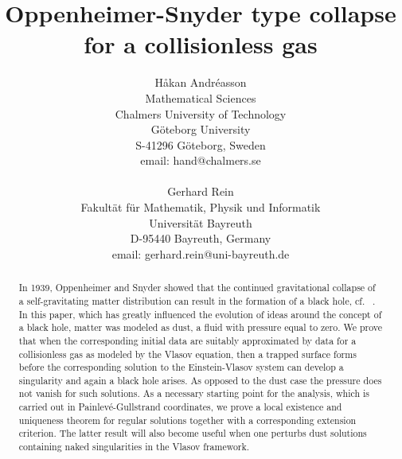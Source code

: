 \documentclass[11pt]{article}
\renewcommand{\theequation}{\arabic{section}.\arabic{equation}}
\begin{document}
\sloppy

\newtheorem{theorem}{Theorem}[section]
\newtheorem{definition}[theorem]{Definition}
\newtheorem{proposition}[theorem]{Proposition}
\newtheorem{cor}[theorem]{Corollary}
\newtheorem{lemma}[theorem]{Lemma}
\newtheorem*{comment}{Comment}
\theoremstyle{remark}
\newtheorem{remark}[theorem]{Remark}

\renewcommand{\theequation}{\arabic{section}.\arabic{equation}}

\title{Oppenheimer-Snyder type collapse for a collisionless gas}

\author{H{\aa}kan Andr\'{e}asson\\
        Mathematical Sciences\\
        Chalmers University of Technology\\
        G\"{o}teborg University\\
        S-41296 G\"oteborg, Sweden\\
        email: hand@chalmers.se\\
        \ \\
        Gerhard Rein\\
        Fakult\"at f\"ur Mathematik, Physik und Informatik\\
        Universit\"at Bayreuth\\
        D-95440 Bayreuth, Germany\\
        email: gerhard.rein@uni-bayreuth.de}

\maketitle

\begin{abstract}
  In 1939, {\sc Oppenheimer} and {\sc Snyder} showed that
  the continued gravitational collapse of a self-gravitating matter
  distribution can result in the formation of a black hole, cf.~ \cite{OS}.
  In this paper, which has greatly influenced the evolution of ideas
  around the concept of a black hole, matter was modeled as dust, a fluid
  with pressure equal to zero. We prove that when the corresponding initial
  data are suitably approximated by data for a collisionless gas
  as modeled by the Vlasov equation, then a trapped surface forms
  before the corresponding solution to the Einstein-Vlasov system
  can develop a singularity and again a black hole arises. As opposed to the
  dust case the pressure does not vanish for such solutions.
  As a necessary
  starting point for the analysis, which is carried out in
  Painlev\'{e}-Gullstrand coordinates, we prove a local existence
  and uniqueness theorem for regular solutions together with a corresponding
  extension criterion. The latter result will also become useful when
  one perturbs dust solutions containing naked singularities in the Vlasov
  framework.
\end{abstract}
%
%
\end{document}
